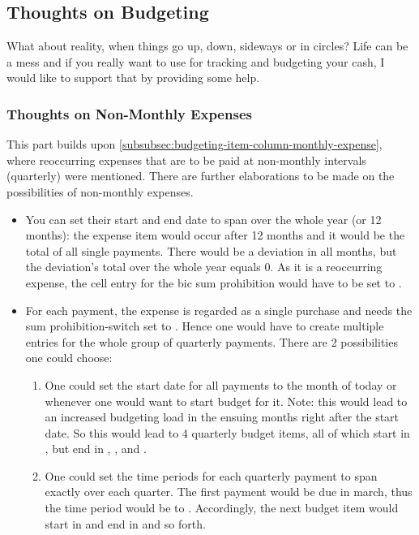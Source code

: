 \subsection{Thoughts on Budgeting}
\label{subsec:thoughts-on-budgeting}

What about reality, when things go up, down, sideways or in circles?
Life can be a mess and if you really want to use \tfn for tracking and budgeting your cash, I would like to support that by providing some help.

\subsubsection{Thoughts on Non-Monthly Expenses}
\label{subsubsec:thoughts-non-monthly-expenses}

This part builds upon \autoref{subsubsec:budgeting-item-column-monthly-expense}, where reoccurring expenses that are to be paid at non-monthly intervals (\eg quarterly) were mentioned.
There are further elaborations to be made on the possibilities of non-monthly expenses.
\begin{itemize}
	\item You can set their start and end date to span over the whole year (or 12 months): the expense item would occur after 12 months and it would be the total of all single payments.
	There would be a deviation in all months, but the deviation's total over the whole year equals 0.
	As it is a reoccurring expense, the cell entry for the \ac{bic} sum prohibition would have to be set to .
	\item For each payment, \ie the expense is regarded as a single purchase and needs the sum prohibition-switch set to .
	Hence one would have to create multiple entries for the whole group of quarterly payments.
	There are 2 possibilities one could choose:
	\begin{enumerate}
		\item One could set the start date for all payments to the month of today or whenever one would want to start budget for it.
		Note: this would lead to an increased budgeting load in the ensuing months right after the start date.
		So this would lead to 4 quarterly budget items, all of which start in , but end in , ,  and .
		\item One could set the time periods for each quarterly payment to span exactly over each quarter.
		The first payment would be due in march, thus the time period would be  to .
		Accordingly, the next budget item would start in  and end in  and so forth.
	\end{enumerate}
\end{itemize}

